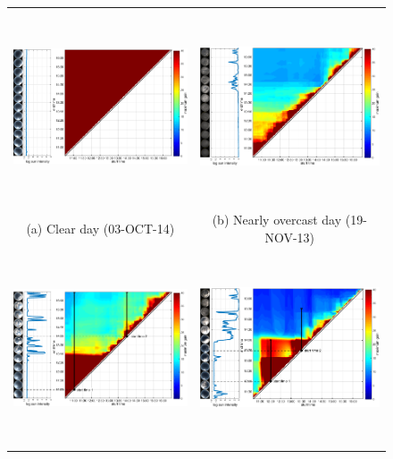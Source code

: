 \begin{figure}[!th]
\centering
\footnotesize
\setlength{\tabcolsep}{0pt}
\begin{tabular}{cc}
\includegraphics[height=5.7cm]{./figures/events/events-20141003-colorbar.pdf} & 
\includegraphics[height=5.7cm]{./figures/events/events-20131119-colorbar.pdf} \\
(a) Clear day (03-OCT-14) & (b) Nearly overcast day (19-NOV-13) \\%
\includegraphics[height=5.7cm]{./figures/events/events-20130824-colorbar.pdf} & 
\includegraphics[height=5.7cm]{./figures/events/events-20131106-colorbar.pdf} \\

\end{tabular}
\end{figure}

